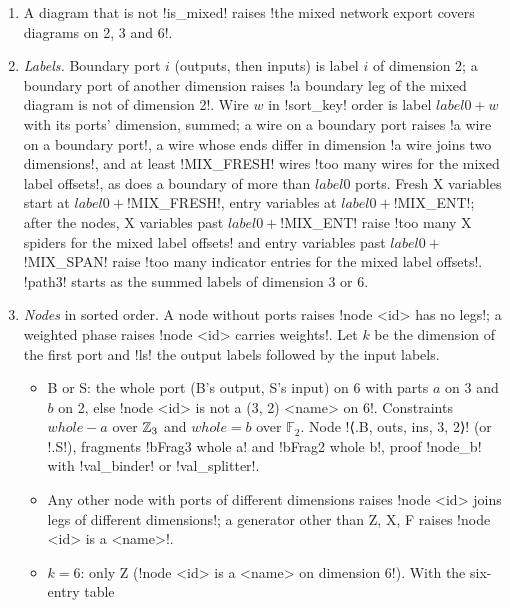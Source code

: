 {{{\begin{algorithm}\label{alg:lean-export-mixed-side}
\begin{enumerate}
\item A diagram that is not \lexpy!is_mixed! raises
\lexcode!the mixed network export covers diagrams on 2, 3 and 6!.
\item \emph{Labels.} Boundary port $i$ (outputs, then inputs) is label $i$ of dimension 2; a
boundary port of another dimension raises
\lexcode!a boundary leg of the mixed diagram is not of dimension 2!. Wire $w$ in \lexpy!sort_key!
order is label $\mathit{label0}+w$ with its ports' dimension, summed; a wire on a boundary port
raises \lexcode!a wire on a boundary port!, a wire whose ends differ in dimension
\lexcode!a wire joins two dimensions!, and at least \lexpy!MIX_FRESH! wires
\lexcode!too many wires for the mixed label offsets!, as does a boundary of more than
$\mathit{label0}$ ports. Fresh X variables start at $\mathit{label0}+$\lexpy!MIX_FRESH!, entry
variables at $\mathit{label0}+$\lexpy!MIX_ENT!; after the nodes, X variables past
$\mathit{label0}+$\lexpy!MIX_ENT! raise \lexcode!too many X spiders for the mixed label offsets!
and entry variables past $\mathit{label0}+$\lexpy!MIX_SPAN! raise
\lexcode!too many indicator entries for the mixed label offsets!.
\lexcode!path3! starts as the summed labels of dimension 3 or 6.
\item \emph{Nodes} in sorted order. A node without ports raises \lexcode!node <id> has no legs!; a
weighted phase raises \lexcode!node <id> carries weights!. Let $k$ be the dimension of the first
port and \lexcode!ls! the output labels followed by the input labels.
\begin{itemize}
\item B or S: the whole port (B's output, S's input) on 6 with parts $a$ on 3 and $b$ on 2,
else \lexcode!node <id> is not a (3, 2) <name> on 6!. Constraints $\mathit{whole}-a$ over
$\mathbb{Z}_3$ and $\mathit{whole}=b$ over $\mathbb{F}_2$. Node \lexlean!⟨.B, outs, ins, 3, 2⟩! (or
\lexlean!.S!), fragments \lexlean!bFrag3 whole a! and \lexlean!bFrag2 whole b!, proof \lexlean!node_b! with
\lexlean!val_binder! or \lexlean!val_splitter!.
\item Any other node with ports of different dimensions raises
\lexcode!node <id> joins legs of different dimensions!; a generator other than Z, X, F raises
\lexcode!node <id> is a <name>!.
\item $k=6$: only Z (\lexcode!node <id> is a <name> on dimension 6!). With the six-entry table

\end{itemize}
\end{enumerate}
\end{algorithm}}}}

